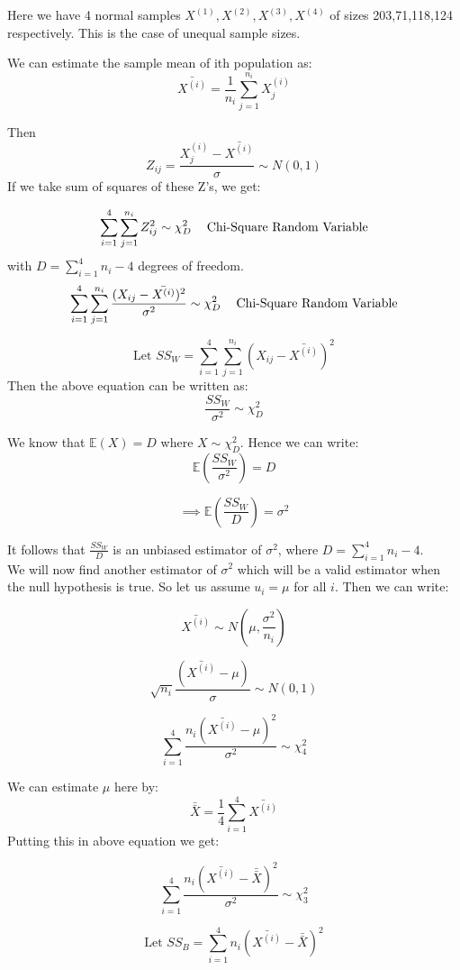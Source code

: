 \documentclass[12pt, letterpaper]{article}
\begin{document}
\bigskip

Here we have 4 normal samples $X^{(1)},X^{(2)},X^{(3)},X^{(4)}$ of sizes 203,71,118,124 respectively. This is the case of unequal sample sizes.

We can estimate the sample mean of ith population as: 
\[ \boxed{\bar{X^{(i)}} = \frac{1}{n_i} \sum_{j=1}^{n_i} X_j^{(i)}} \]

Then \[Z_{ij} = \frac{X^{(i)}_j-\bar{X^{(i)}}}{\sigma} \sim N(0,1)\] If we take sum of squares of these Z's, we get:

\[ \sum_{i=1}^{4} \sum_{j=1}^{n_i} Z_{ij}^2 \sim \chi^2_{D} \text{ \;\; Chi-Square Random Variable}\]
with $D = \sum_{i=1}^{4} n_i - 4 $ degrees of freedom. \\

\[ \sum_{i=1}^{4} \sum_{j=1}^{n_i} \frac{(X_{ij} - \bar{X^{(i)}})^2}{\sigma^2} \sim \chi^2_{D} \text{ \;\; Chi-Square Random Variable}\]

\[ \text{Let } SS_W = \sum_{i=1}^{4} \sum_{j=1}^{n_i} (X_{ij} - \bar{X^{(i)}})^2 \] 
Then the above equation can be written as:
\[ \frac{SS_W}{\sigma^2} \sim \chi^2_{D}\]

We know that $\mathbb{E}(X) = D$ where $X \sim \chi^2_{D}$. Hence we can write:
\[ \mathbb{E}(\frac{SS_W}{\sigma^2}) = D \]

\[ \implies \boxed{\mathbb{E}(\frac{SS_W}{D})= \sigma^2} \]

It follows that $\frac{SS_W}{D}$ is an unbiased estimator of $\sigma^2$, where $D = \sum_{i=1}^{4} n_i - 4$. \\

We will now find another estimator of $\sigma^2$ which will be a valid estimator when the null hypothesis is true. So let us assume $u_i = \mu$ for all $i$. Then we can write:

\[ \bar{X^{(i)}} \sim N(\mu,\frac{\sigma^2}{n_i}) \]

\[ \sqrt{n_i}\frac{(\bar{X^{(i)}} - \mu)}{\sigma} \sim N(0,1) \]

\[ \sum_{i=1}^{4} \frac{n_i(\bar{X^{(i)}} - \mu)^2}{\sigma^2} \sim \chi^2_{4} \]

We can estimate $\mu$ here by:
\[ \boxed{\bar{\bar{X}} = \frac{1}{4} \sum_{i=1}^{4}  \bar{X^{(i)}}} \] Putting this in above equation we get:

\[ \sum_{i=1}^{4} \frac{n_i(\bar{X^{(i)}} - \bar{\bar{X}})^2}{\sigma^2} \sim \chi^2_{3} \]

\[ \text{Let } SS_B = \sum_{i=1}^{4} n_i(\bar{X^{(i)}} - \bar{\bar{X}})^2 \]
\end{document}
